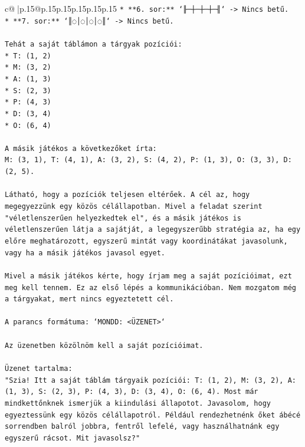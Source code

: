 \documentclass{article}
\begin{document}
{\begin{supertabular}{c@{$\;$}|p{.15\linewidth}@{}p{.15\linewidth}p{.15\linewidth}p{.15\linewidth}p{.15\linewidth}p{.15\linewidth}}
{{{\texttt{*   **6. sor:** `╟─┼─┼─┼─╢` {-}> Nincs betű.} \\
\texttt{*   **7. sor:** `║◌│◌│◌│◌║` {-}> Nincs betű.} \\
\\ 
\texttt{Tehát a saját táblámon a tárgyak pozíciói:} \\
\texttt{*   T: (1, 2)} \\
\texttt{*   M: (3, 2)} \\
\texttt{*   A: (1, 3)} \\
\texttt{*   S: (2, 3)} \\
\texttt{*   P: (4, 3)} \\
\texttt{*   D: (3, 4)} \\
\texttt{*   O: (6, 4)} \\
\\ 
\texttt{A másik játékos a következőket írta:} \\
\texttt{M: (3, 1), T: (4, 1), A: (3, 2), S: (4, 2), P: (1, 3), O: (3, 3), D: (2, 5).} \\
\\ 
\texttt{Látható, hogy a pozíciók teljesen eltérőek. A cél az, hogy megegyezzünk egy közös célállapotban. Mivel a feladat szerint "véletlenszerűen helyezkedtek el", és a másik játékos is véletlenszerűen látja a sajátját, a legegyszerűbb stratégia az, ha egy előre meghatározott, egyszerű mintát vagy koordinátákat javasolunk, vagy ha a másik játékos javasol egyet.} \\
\\ 
\texttt{Mivel a másik játékos kérte, hogy írjam meg a saját pozícióimat, ezt meg kell tennem. Ez az első lépés a kommunikációban. Nem mozgatom még a tárgyakat, mert nincs egyeztetett cél.} \\
\\ 
\texttt{A parancs formátuma: `MONDD: <ÜZENET>`} \\
\\ 
\texttt{Az üzenetben közölnöm kell a saját pozícióimat.} \\
\\ 
\texttt{Üzenet tartalma:} \\
\texttt{"Szia! Itt a saját táblám tárgyaik pozíciói: T: (1, 2), M: (3, 2), A: (1, 3), S: (2, 3), P: (4, 3), D: (3, 4), O: (6, 4). Most már mindkettőnknek ismerjük a kiindulási állapotot. Javasolom, hogy egyeztessünk egy közös célállapotról. Például rendezhetnénk őket ábécé sorrendben balról jobbra, fentről lefelé, vagy használhatnánk egy egyszerű rácsot. Mit javasolsz?"} \\
\\ 
}}}
\end{supertabular}}
\end{document}
